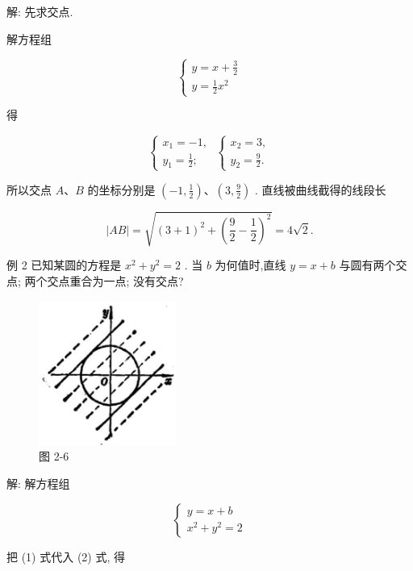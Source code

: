 \documentclass[lang=cn,newtx,10.5pt,scheme=chinese]{elegantbook}
\begin{document}
解: 先求交点.

解方程组

\[
  \left\{ \begin{array}{l} y = x + \frac{3}{2} \\ y = \frac{1}{2}{x}^{2} \end{array}\right.
\]

得

\[
  \left\{ {\begin{array}{l} {x}_{1} = - 1, \\ {y}_{1} = \frac{1}{2}; \end{array}\;\left\{ \begin{array}{l} {x}_{2} = 3, \\ {y}_{2} = \frac{9}{2}. \end{array}\right. }\right.
\]

所以交点 \(A\text{、}B\) 的坐标分别是 \(\left( {-1,\frac{1}{2}}\right) \text{、}\left( {3,\frac{9}{2}}\right)\) . 直线被曲线截得的线段长

\[
  \left| {AB}\right| = \sqrt{{\left( 3 + 1\right) }^{2} + {\left( \frac{9}{2} - \frac{1}{2}\right) }^{2}} = 4\sqrt{2}.
\]

例 2 已知某圆的方程是 \({x}^{2} + {y}^{2} = 2\) . 当 \(b\) 为何值时,直线 \(y = x + b\) 与圆有两个交点; 两个交点重合为一点; 没有交点?

\begin{figure}[h]
  \centering
  \includegraphics[max width=0.4\textwidth]{images/01912cc2-ffb6-728e-9ae7-b113ff05c64b_75_443692.jpg}
  \caption{图 2-6}
\end{figure}



解: 解方程组

\[
  \left\{ \begin{array}{l} y = x + b \\ {x}^{2} + {y}^{2} = 2 \end{array}\right. \tag{1 2}
\]

把 (1) 式代入 (2) 式, 得
\end{document}
